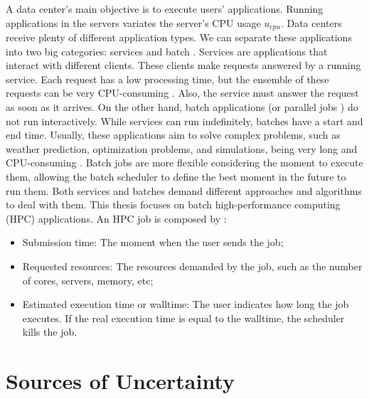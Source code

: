 A data center's main objective is to execute users' applications. Running applications in the servers variates the server's CPU usage $u_{cpu}$. Data centers receive plenty of different application types. We can separate these applications into two big categories: services and batch \cite{rostirolla2022survey,da2018modeling}. Services are applications that interact with different clients. These clients make requests answered by a running service. Each request has a low processing time, but the ensemble of these requests can be very CPU-consuming \cite{masdari2020survey}. Also, the service must answer the request as soon as it arrives. On the other hand, batch applications (or parallel jobs \cite{feitelson2014experience}) do not run interactively. While services can run indefinitely, batches have a start and end time. Usually, these applications aim to solve complex problems, such as weather prediction, optimization problems, and simulations, being very long and CPU-consuming \cite{masdari2020survey}. Batch jobs are more flexible considering the moment to execute them, allowing the batch scheduler to define the best moment in the future to run them. Both services and batches demand different approaches and algorithms to deal with them. This thesis focuses on batch high-performance computing (HPC) applications. An HPC job is composed by \cite{rostirolla2022survey, srinivasan2002characterization, takizawa2020effect}:

\begin{itemize}
    \item Submission time: The moment when the user sends the job;
    \item Requested resources: The resources demanded by the job, such as the number of cores, servers, memory, etc;
    \item Estimated execution time or walltime: The user indicates how long the job executes. If the real execution time is equal to the walltime, the scheduler kills the job. 
\end{itemize}


\section{Sources of Uncertainty}

